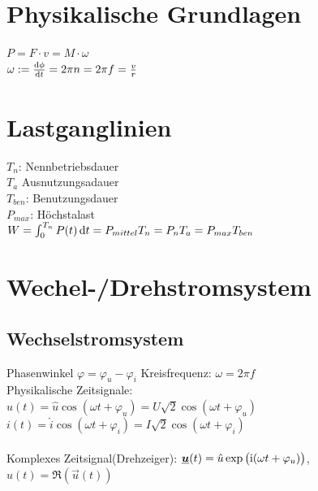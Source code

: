 \documentclass[fs, footer]{latex4ei}
\begin{document}
\begin{multicols}{4}



	\section{Physikalische Grundlagen}
	$P = F \cdot v = M \cdot \omega$ \\
	$\omega := \frac{\diff \phi}{\diff t} = 2 \pi n = 2 \pi f = \frac{v}{r}$ \\


	\section{Lastganglinien}
	$T_n$: Nennbetriebsdauer\\
	$T_a$ Ausnutzungsadauer\\
	$T_{ben}$: Benutzungsdauer\\
	$P_{max}$: Höchstalast\\
	$W = \int_0^{T_n} P(t) \diff t = P_{mittel} T_n = P_n T_a = P_{max} T_{ben}$\\
	
	\section{Wechel-/Drehstromsystem}


		\subsection{Wechselstromsystem}
		Phasenwinkel $\varphi = \varphi_u - \varphi_i$ \qquad Kreisfrequenz: $\omega = 2\pi f$\\
		
		
		Physikalische Zeitsignale:\\
		$u(t) = \hat u \cos(\omega t + \varphi_u) = U \sqrt{2} \cos(\omega t + \varphi_u)$\\
		$i(t) = \hat i \cos(\omega t + \varphi_i) = I \sqrt{2} \cos(\omega t + \varphi_i)$\\
		\\
		Komplexes Zeitsignal(Drehzeiger): $\underline{\boldsymbol {u}}(t) = \hat u \exp\big(\mathrm{i} (\omega t + \varphi_u)\big)$, 
		$u(t) = \Re(\vec u(t))$\\
		

\end{multicols}
\end{document}

